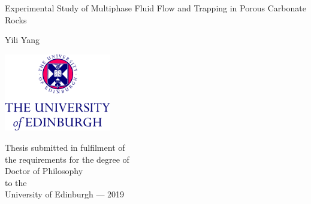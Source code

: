

\thispagestyle{empty}

\begin{minipage}{\textwidth}
\end{minipage}
\begin{center}
\vspace{2cm}
{ \Huge Experimental Study of Multiphase Fluid Flow and Trapping in Porous Carbonate Rocks
  \par
  \vspace{0.5cm} 
{\Large Yili Yang \par}
}
\end{center}
\vfill
\begin{center}
\vspace{6cm}    
\centerline{\includegraphics[width=0.35\textwidth]{../preface/2Line2ColCMYK_CS3.pdf}}
\vspace{0.5cm}
Thesis submitted in fulfilment of\\
the requirements for the degree of\\ 
Doctor of Philosophy\\ 
to the\\
University of Edinburgh --- 2019
\end{center}

\newpage
\thispagestyle{empty}


